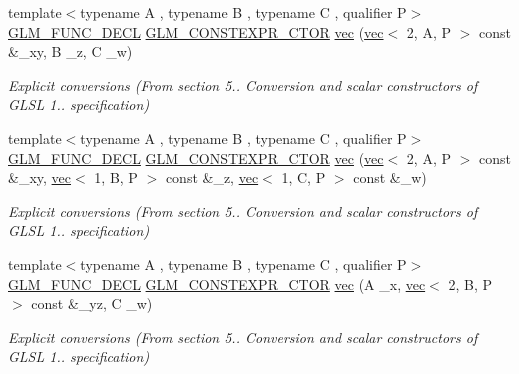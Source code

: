 \begin{DoxyCompactItemize}
{\footnotesize template$<$typename A , typename B , typename C , qualifier P$>$ }\\\hyperlink{setup_8hpp_ab2d052de21a70539923e9bcbf6e83a51}{G\+L\+M\+\_\+\+F\+U\+N\+C\+\_\+\+D\+E\+CL} \hyperlink{setup_8hpp_ad34178a09666081abdb573c14d1f4a5a}{G\+L\+M\+\_\+\+C\+O\+N\+S\+T\+E\+X\+P\+R\+\_\+\+C\+T\+OR} \hyperlink{structglm_1_1vec_3_014_00_01_t_00_01_q_01_4_a973c9293d62029453e5e2619061f84e8}{vec} (\hyperlink{structglm_1_1vec}{vec}$<$ 2, A, P $>$ const \&\+\_\+xy, B \+\_\+z, C \+\_\+w)
\begin{DoxyCompactList}\small\item\em Explicit conversions (From section 5.. Conversion and scalar constructors of G\+L\+SL 1.. specification) \end{DoxyCompactList}\item 
{\footnotesize template$<$typename A , typename B , typename C , qualifier P$>$ }\\\hyperlink{setup_8hpp_ab2d052de21a70539923e9bcbf6e83a51}{G\+L\+M\+\_\+\+F\+U\+N\+C\+\_\+\+D\+E\+CL} \hyperlink{setup_8hpp_ad34178a09666081abdb573c14d1f4a5a}{G\+L\+M\+\_\+\+C\+O\+N\+S\+T\+E\+X\+P\+R\+\_\+\+C\+T\+OR} \hyperlink{structglm_1_1vec_3_014_00_01_t_00_01_q_01_4_ae72bf7baa584d35cfadd6d3be750518b}{vec} (\hyperlink{structglm_1_1vec}{vec}$<$ 2, A, P $>$ const \&\+\_\+xy, \hyperlink{structglm_1_1vec}{vec}$<$ 1, B, P $>$ const \&\+\_\+z, \hyperlink{structglm_1_1vec}{vec}$<$ 1, C, P $>$ const \&\+\_\+w)
\begin{DoxyCompactList}\small\item\em Explicit conversions (From section 5.. Conversion and scalar constructors of G\+L\+SL 1.. specification) \end{DoxyCompactList}\item 
{\footnotesize template$<$typename A , typename B , typename C , qualifier P$>$ }\\\hyperlink{setup_8hpp_ab2d052de21a70539923e9bcbf6e83a51}{G\+L\+M\+\_\+\+F\+U\+N\+C\+\_\+\+D\+E\+CL} \hyperlink{setup_8hpp_ad34178a09666081abdb573c14d1f4a5a}{G\+L\+M\+\_\+\+C\+O\+N\+S\+T\+E\+X\+P\+R\+\_\+\+C\+T\+OR} \hyperlink{structglm_1_1vec_3_014_00_01_t_00_01_q_01_4_a888477e1cf2c8bf5418e99450ea850c1}{vec} (A \+\_\+x, \hyperlink{structglm_1_1vec}{vec}$<$ 2, B, P $>$ const \&\+\_\+yz, C \+\_\+w)
\begin{DoxyCompactList}\small\item\em Explicit conversions (From section 5.. Conversion and scalar constructors of G\+L\+SL 1.. specification) \end{DoxyCompactList}\item 

\end{DoxyCompactItemize}
